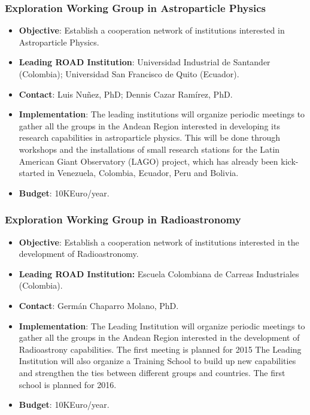 \documentclass[12pt]{article}
\begin{document}
\subsubsection{Exploration Working Group in Astroparticle Physics}
\begin{itemize}
\item{\bf Objective}: Establish a cooperation network of institutions
  interested in Astroparticle Physics.
\item{\bf Leading ROAD Institution}: Universidad
  Industrial de Santander (Colombia); Universidad San
  Francisco de Quito (Ecuador). 
\item{\bf Contact}: Luis Nu\~nez, PhD; Dennis Cazar Ram\'irez, PhD. 
\item{\bf Implementation}: The leading institutions will organize
  periodic meetings to gather all the groups in the Andean Region
  interested in developing its research capabilities in astroparticle
  physics. This will be done through workshops and the installations
  of small research stations for the Latin American Giant Observatory
  (LAGO) project, which has already been kick-started 
  in Venezuela, Colombia, Ecuador, Peru and Bolivia.
\item{\bf Budget}: 10KEuro/year.
\end{itemize}

\subsubsection{Exploration Working Group in Radioastronomy}
\begin{itemize}
\item{\bf Objective}: Establish a cooperation network of institutions interested in the development of Radioastronomy.
\item{\bf Leading ROAD Institution:} Escuela Colombiana de Carreas
  Industriales (Colombia).
\item{\bf Contact}: Germ\'an Chaparro Molano, PhD.
\item{\bf Implementation}: The Leading Institution will organize
  periodic meetings to gather all the groups in the Andean Region
  interested in the development of Radioastrony capabilities. The
  first meeting is planned for 2015 
The Leading Institution will also organize a Training School to build
up new capabilities and strengthen the ties between different groups
and countries. The first school is planned for 2016.
\item{\bf Budget}: 10KEuro/year.
\end{itemize}
\end{document}
